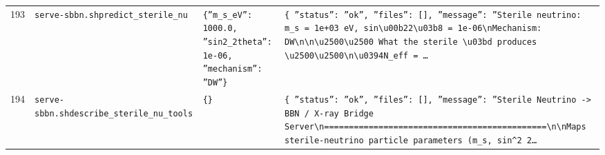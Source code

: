 \documentclass[11pt,a4paper]{article}
\begin{document}
\begin{longtable}{@{}p{}p{}p{}p{}@{}}
193 & \texttt{serve-sbbn.sh}\newline\texttt{predict\_\allowbreak{}sterile\_\allowbreak{}nu} & \texttt{\{''m\_\allowbreak{}s\_\allowbreak{}eV'':\allowbreak{} 1000.0,\allowbreak{} ''sin2\_\allowbreak{}2theta'':\allowbreak{} 1e-06,\allowbreak{} ''mechanism'':\allowbreak{} ''DW''\}\allowbreak{}} & \texttt{\{   ''status'':\allowbreak{} ''ok'',\allowbreak{}   ''files'':\allowbreak{} []\allowbreak{},\allowbreak{}   ''message'':\allowbreak{} ''Sterile neutrino:\allowbreak{} m\_\allowbreak{}s =\allowbreak{} 1e+03 eV,\allowbreak{} sin\textbackslash{}\allowbreak{}u00b22\textbackslash{}\allowbreak{}u03b8 =\allowbreak{} 1e-06\textbackslash{}\allowbreak{}nMechanism:\allowbreak{} DW\textbackslash{}\allowbreak{}n\textbackslash{}\allowbreak{}n\textbackslash{}\allowbreak{}u2500\textbackslash{}\allowbreak{}u2500 What the sterile \textbackslash{}\allowbreak{}u03bd produces \textbackslash{}\allowbreak{}u2500\textbackslash{}\allowbreak{}u2500\textbackslash{}\allowbreak{}n\textbackslash{}\allowbreak{}u0394N\_\allowbreak{}eff =\allowbreak{} \ldots{}\allowbreak{}} \\
194 & \texttt{serve-sbbn.sh}\newline\texttt{describe\_\allowbreak{}sterile\_\allowbreak{}nu\_\allowbreak{}tools} & \texttt{\{\}\allowbreak{}} & \texttt{\{   ''status'':\allowbreak{} ''ok'',\allowbreak{}   ''files'':\allowbreak{} []\allowbreak{},\allowbreak{}   ''message'':\allowbreak{} ''Sterile Neutrino -\textgreater{}\allowbreak{} BBN /\allowbreak{} X-ray Bridge Server\textbackslash{}\allowbreak{}n=\allowbreak{}=\allowbreak{}=\allowbreak{}=\allowbreak{}=\allowbreak{}=\allowbreak{}=\allowbreak{}=\allowbreak{}=\allowbreak{}=\allowbreak{}=\allowbreak{}=\allowbreak{}=\allowbreak{}=\allowbreak{}=\allowbreak{}=\allowbreak{}=\allowbreak{}=\allowbreak{}=\allowbreak{}=\allowbreak{}=\allowbreak{}=\allowbreak{}=\allowbreak{}=\allowbreak{}=\allowbreak{}=\allowbreak{}=\allowbreak{}=\allowbreak{}=\allowbreak{}=\allowbreak{}=\allowbreak{}=\allowbreak{}=\allowbreak{}=\allowbreak{}=\allowbreak{}=\allowbreak{}=\allowbreak{}=\allowbreak{}=\allowbreak{}=\allowbreak{}=\allowbreak{}=\allowbreak{}=\allowbreak{}=\allowbreak{}=\allowbreak{}\textbackslash{}\allowbreak{}n\textbackslash{}\allowbreak{}nMaps sterile-neutrino particle parameters (m\_\allowbreak{}s,\allowbreak{} sin\textasciicircum{}\allowbreak{}2 2\ldots{}\allowbreak{}} \\

\end{longtable}
\end{document}

